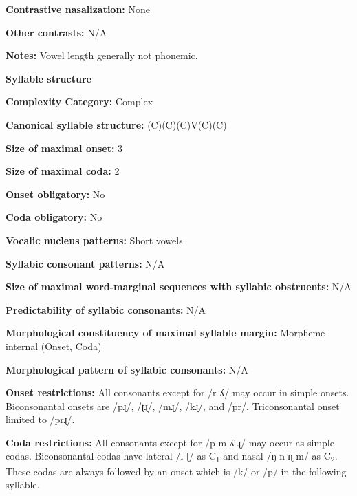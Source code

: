 \textbf{Contrastive nasalization:} None



\textbf{Other contrasts:} N/A



\textbf{Notes:} Vowel length generally not phonemic.



\textbf{Syllable structure}



\textbf{Complexity Category:} Complex



\textbf{Canonical syllable structure:} (C)(C)(C)V(C)(C) \citep[23-6]{Rumsey1978}



\textbf{Size of maximal onset:} 3



\textbf{Size of maximal coda:} 2



\textbf{Onset obligatory:} No



\textbf{Coda obligatory:} No



\textbf{Vocalic nucleus patterns:} Short vowels



\textbf{Syllabic consonant patterns:} N/A



\textbf{Size of maximal word{}-marginal sequences with syllabic obstruents:} N/A



\textbf{Predictability of syllabic consonants:} N/A



\textbf{Morphological constituency of maximal syllable margin:} Morpheme-internal (Onset, Coda)



\textbf{Morphological pattern of syllabic consonants:} N/A



\textbf{Onset restrictions:} All consonants except for /r ʎ/ may occur in simple onsets. Biconsonantal onsets are /pɻ/, /ʈɻ/, /mɻ/, /kɻ/, and /pr/. Triconsonantal onset limited to /prɻ/.



\textbf{Coda restrictions:} All consonants except for /p m ʎ ɻ/ may occur as simple codas. Biconsonantal codas have lateral /l ɭ/ as C\textsubscript{1} and nasal /ŋ n ɳ m/ as C\textsubscript{2}. These codas are always followed by an onset which is /k/ or /p/ in the following syllable.



